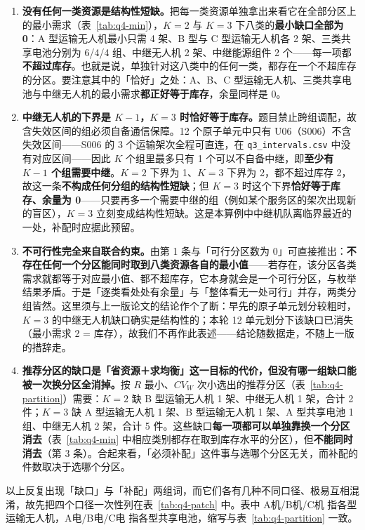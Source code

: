 \begin{enumerate}
	\item \textbf{没有任何一类资源是结构性短缺。}把每一类资源单独拿出来看它在全部分区上的最小需求（表~\ref{tab:q4-min}），$K=2$ 与 $K=3$ 下八类的\textbf{最小缺口全部为 0}：A 型运输无人机最小只需 4 架、B 型与 C 型运输无人机各 2 架、三类共享电池分别为 6/4/4 组、中继无人机 2 架、中继能源组件 2 个——每一项都\textbf{不超过库存}。也就是说，单独针对这八类中的任何一类，都存在一个不超库存的分区。要注意其中的「恰好」之处：A、B、C 型运输无人机、三类共享电池与中继无人机的最小需求\textbf{都正好等于库存}，余量同样是 0。
	\item \textbf{中继无人机的下界是 $K-1$，$K=3$ 时恰好等于库存。}题目禁止跨组调配，故含失效区间的组必须自备通信保障。12 个原子单元中只有 U06（S006）不含失效区间——S006 的 3 个运输架次全程可直连，在 \texttt{q3\_intervals.csv} 中没有对应区间——因此 $K$ 个组里最多只有 1 个可以不自备中继，即\textbf{至少有 $K-1$ 个组需要中继}。$K=2$ 下界为 1、$K=3$ 下界为 2，都不超过库存 2，故这一条\textbf{不构成任何分组的结构性短缺}；但 $K=3$ 时这个下界\textbf{恰好等于库存、余量为 0}——只要再多一个需要中继的组（例如某个服务区的架次出现新的盲区），$K=3$ 立刻变成结构性短缺。这是本算例中中继机队离临界最近的一处，补配时应据此预留。
	\item \textbf{不可行性完全来自联合约束。}由第 1 条与「可行分区数为 0」可直接推出：\textbf{不存在任何一个分区能同时取到八类资源各自的最小值}——若存在，该分区各类需求就都等于对应最小值、都不超库存，它本身就会是一个可行分区，与枚举结果矛盾。于是「逐类看处处有余量」与「整体看无一处可行」并存，两类分组皆然。这里须与上一版论文的结论作个了断：早先的原子单元划分较粗时，$K=3$ 的中继无人机缺口确实是结构性的；本轮 12 单元划分下该缺口已消失（最小需求 2 = 库存），故我们不再作此表述——结论随数据走，不随上一版的措辞走。
	\item \textbf{推荐分区的缺口是「省资源＋求均衡」这一目标的代价，但没有哪一组缺口能被一次换分区全消掉。}按 $R$ 最小、$CV_W$ 次小选出的推荐分区（表~\ref{tab:q4-partition}）需要：$K=2$ 缺 B 型运输无人机 1 架、中继无人机 1 架，合计 2 件；$K=3$ 缺 A 型运输无人机 1 架、B 型运输无人机 1 架、A 型共享电池 1 组、中继无人机 2 架，合计 5 件。这些缺口\textbf{每一项都可以单独靠换一个分区消去}（表~\ref{tab:q4-min} 中相应类别都存在取到库存水平的分区），但\textbf{不能同时消去}（第 3 条）。合起来看，「必须补配」这件事与选哪个分区无关，而补配的件数取决于选哪个分区。
\end{enumerate}

以上反复出现「缺口」与「补配」两组词，而它们各有几种不同口径、极易互相混淆，故先把四个口径一次性列在表~\ref{tab:q4-patch} 中。表中 A机/B机/C机 指各型运输无人机，A电/B电/C电 指各型共享电池，缩写与表~\ref{tab:q4-partition} 一致。

